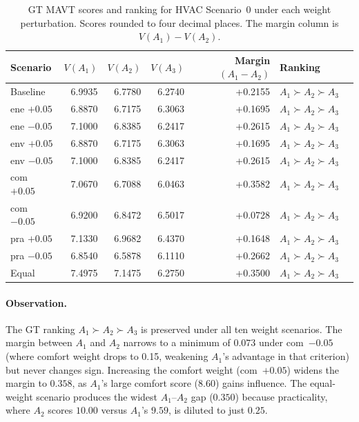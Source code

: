 \documentclass[11pt]{article}
\begin{document}
\begin{table}[ht]
\centering
\caption{GT MAVT scores and ranking for HVAC Scenario~0 under each weight
  perturbation.  Scores rounded to four decimal places.
  The margin column is $V(A_1) - V(A_2)$.}
\label{tab:sensitivity-gt}
\begin{tabular}{lrrrrll}
  \toprule
  Scenario    & $V(A_1)$ & $V(A_2)$ & $V(A_3)$ & Margin$(A_1{-}A_2)$ & Ranking \\
  \midrule
  Baseline    & 6.9935 & 6.7780 & 6.2740 & +0.2155 & $A_1 \succ A_2 \succ A_3$ \\
  ene $+0.05$ & 6.8870 & 6.7175 & 6.3063 & +0.1695 & $A_1 \succ A_2 \succ A_3$ \\
  ene $-0.05$ & 7.1000 & 6.8385 & 6.2417 & +0.2615 & $A_1 \succ A_2 \succ A_3$ \\
  env $+0.05$ & 6.8870 & 6.7175 & 6.3063 & +0.1695 & $A_1 \succ A_2 \succ A_3$ \\
  env $-0.05$ & 7.1000 & 6.8385 & 6.2417 & +0.2615 & $A_1 \succ A_2 \succ A_3$ \\
  com $+0.05$ & 7.0670 & 6.7088 & 6.0463 & +0.3582 & $A_1 \succ A_2 \succ A_3$ \\
  com $-0.05$ & 6.9200 & 6.8472 & 6.5017 & +0.0728 & $A_1 \succ A_2 \succ A_3$ \\
  pra $+0.05$ & 7.1330 & 6.9682 & 6.4370 & +0.1648 & $A_1 \succ A_2 \succ A_3$ \\
  pra $-0.05$ & 6.8540 & 6.5878 & 6.1110 & +0.2662 & $A_1 \succ A_2 \succ A_3$ \\
  Equal       & 7.4975 & 7.1475 & 6.2750 & +0.3500 & $A_1 \succ A_2 \succ A_3$ \\
  \bottomrule
\end{tabular}
\end{table}

\paragraph{Observation.}
The GT ranking $A_1 \succ A_2 \succ A_3$ is preserved under all ten weight
scenarios.  The margin between $A_1$ and $A_2$ narrows to a minimum of $0.073$
under com~$-0.05$ (where comfort weight drops to 0.15, weakening $A_1$'s
advantage in that criterion) but never changes sign.  Increasing the comfort
weight (com~$+0.05$) widens the margin to $0.358$, as $A_1$'s large comfort
score ($8.60$) gains influence.  The equal-weight scenario produces the
widest $A_1$--$A_2$ gap ($0.350$) because practicality, where $A_2$ scores
$10.00$ versus $A_1$'s $9.59$, is diluted to just $0.25$.
\end{document}
